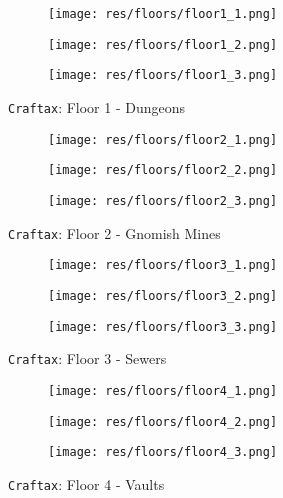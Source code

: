 \documentclass{article}
\theoremstyle{plain}
\theoremstyle{definition}
\theoremstyle{remark}
\begin{document}
\begin{figure*}
    \centering
    \begin{subfigure}{0.28\linewidth}
        \texttt{[image: res/floors/floor1\_1.png]}
    \end{subfigure}\hfill%
    \begin{subfigure}{0.28\linewidth}
        \texttt{[image: res/floors/floor1\_2.png]}
    \end{subfigure}\hfill%
    \begin{subfigure}{0.28\linewidth}
        \texttt{[image: res/floors/floor1\_3.png]}
    \end{subfigure}\hfill%
    \caption{\texttt{Craftax}: Floor 1 - Dungeons}
    \label{fig:app_craftax_classic_level_1}

    
    \centering
    \begin{subfigure}{0.28\linewidth}
        \texttt{[image: res/floors/floor2\_1.png]}
    \end{subfigure}\hfill%
    \begin{subfigure}{0.28\linewidth}
        \texttt{[image: res/floors/floor2\_2.png]}
    \end{subfigure}\hfill%
    \begin{subfigure}{0.28\linewidth}
        \texttt{[image: res/floors/floor2\_3.png]}
    \end{subfigure}\hfill%
    \caption{\texttt{Craftax}: Floor 2 - Gnomish Mines}
    \label{fig:app_craftax_classic_level_2}

    
    \centering
    \begin{subfigure}{0.28\linewidth}
        \texttt{[image: res/floors/floor3\_1.png]}
    \end{subfigure}\hfill%
    \begin{subfigure}{0.28\linewidth}
        \texttt{[image: res/floors/floor3\_2.png]}
    \end{subfigure}\hfill%
    \begin{subfigure}{0.28\linewidth}
        \texttt{[image: res/floors/floor3\_3.png]}
    \end{subfigure}\hfill%
    \caption{\texttt{Craftax}: Floor 3 - Sewers}
    \label{fig:app_craftax_classic_level_3}

    \centering
    \begin{subfigure}{0.28\linewidth}
        \texttt{[image: res/floors/floor4\_1.png]}
    \end{subfigure}\hfill%
    \begin{subfigure}{0.28\linewidth}
        \texttt{[image: res/floors/floor4\_2.png]}
    \end{subfigure}\hfill%
    \begin{subfigure}{0.28\linewidth}
        \texttt{[image: res/floors/floor4\_3.png]}
    \end{subfigure}\hfill%
    \caption{\texttt{Craftax}: Floor 4 - Vaults}
    \label{fig:app_craftax_classic_level_4}

\end{figure*}
\end{document}

